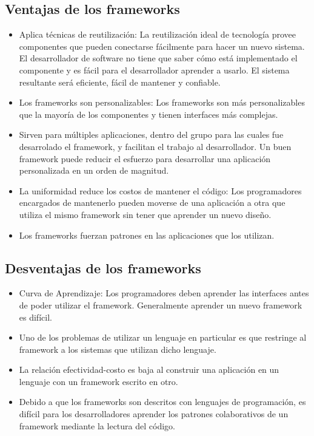\subsection {Ventajas de los frameworks}
\begin{itemize}
	\item Aplica técnicas de reutilización: La reutilización ideal de tecnología
	provee componentes que pueden conectarse fácilmente para hacer un nuevo sistema.
	El desarrollador de software no tiene que saber cómo está implementado el
	componente y es fácil para el desarrollador aprender a usarlo. El sistema
	resultante será eficiente, fácil de mantener y confiable.
	
	\item Los frameworks son personalizables: Los frameworks son más
	personalizables que la mayoría de los componentes y tienen interfaces más
	complejas.
	
	\item Sirven para múltiples aplicaciones, dentro del grupo para
	las cuales fue desarrolado el framework, y facilitan el trabajo al
	desarrollador. Un buen framework puede reducir el esfuerzo
	para desarrollar una aplicación personalizada en un orden de magnitud.
	
	\item La uniformidad reduce los costos de mantener el código: Los programadores
	encargados de mantenerlo pueden moverse de una aplicación a otra que utiliza el
	mismo framework sin tener que aprender un nuevo diseño.
	
	\item Los frameworks fuerzan patrones en las aplicaciones que los utilizan.

\end{itemize}

\subsection {Desventajas de los frameworks}
\begin{itemize}
    \item Curva de Aprendizaje: Los programadores deben aprender las interfaces
    antes de poder utilizar el framework. Generalmente aprender un nuevo
    framework es difícil.
    
    \item Uno de los problemas de utilizar un lenguaje en particular es que
    restringe al framework a los sistemas que utilizan dicho lenguaje.
    
    \item La relación efectividad-costo es baja al construir una aplicación en
    un lenguaje con un framework escrito en otro.
    
    \item Debido a que los frameworks son descritos con lenguajes de
    programación, es difícil para los desarrolladores aprender los patrones
    colaborativos de un framework mediante la lectura del código.
    
\end{itemize}

